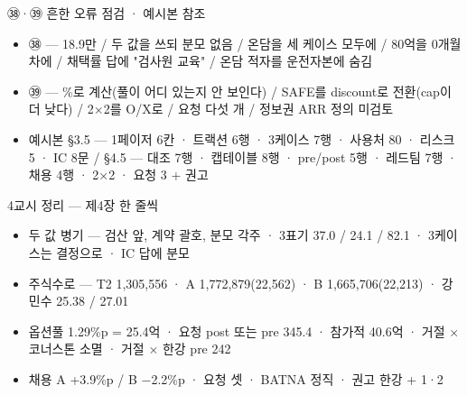 \begin{frame}{㊳·㊴ 흔한 오류 점검 · 예시본 참조}
\begin{itemize}
\item ㊳ — 18.9만 / 두 값을 쓰되 분모 없음 / 온담을 세 케이스 모두에 / 80억을 0개월차에 / 채택률 답에 "검사원 교육" / 온담 적자를 운전자본에 숨김
\item ㊴ — \%로 계산(풀이 어디 있는지 안 보인다) / SAFE를 discount로 전환(cap이 더 낮다) / 2×2를 O/X로 / 요청 다섯 개 / 정보권 ARR 정의 미검토
\item 예시본 §3.5 — 1페이저 6칸 · 트랙션 6행 · 3케이스 7행 · 사용처 80 · 리스크 5 · IC 8문 / §4.5 — 대조 7행 · 캡테이블 8행 · pre/post 5행 · 레드팀 7행 · 채용 4행 · 2×2 · 요청 3 + 권고
\end{itemize}
\end{frame}

\begin{frame}{4교시 정리 — 제4장 한 줄씩}
\begin{itemize}
\item 두 값 병기 — 검산 앞, 계약 괄호, 분모 각주 · 3표기 37.0 / 24.1 / 82.1 · 3케이스는 결정으로 · IC 답에 분모
\item 주식수로 — T2 1,305,556 · A 1,772,879(22,562) · B 1,665,706(22,213) · 강민수 25.38 / 27.01
\item 옵션풀 1.29\%p = 25.4억 · 요청 post 또는 pre 345.4 · 참가적 40.6억 · 거절 × 코너스톤 소멸 · 거절 × 한강 pre 242
\item 채용 A +3.9\%p / B $-$2.2\%p · 요청 셋 · BATNA 정직 · 권고 한강 + 1·2
\end{itemize}
\end{frame}

